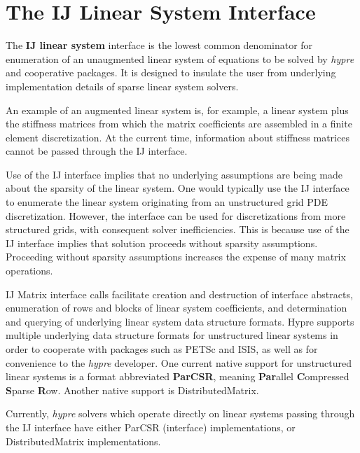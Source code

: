 \chapter{The IJ Linear System Interface}
\label{IJ}

The {\bf IJ linear system} interface is the lowest common denominator
for enumeration of an unaugmented linear system of equations to be
solved by {\slshape hypre} and cooperative packages.  It is designed
to insulate the user from underlying implementation details of sparse
linear system solvers.

An example of an augmented linear system is, for example, a linear
system plus the stiffness matrices from which the matrix coefficients
are assembled in a finite element discretization.  At the current time,
information about stiffness
matrices cannot be passed through the IJ interface. 

Use of the IJ interface implies that no underlying
assumptions are being made about the sparsity of the linear system. 
One would typically use the IJ interface to enumerate the linear
system originating from an unstructured grid PDE discretization.
However, the interface can be used for discretizations from more
structured grids, with consequent solver inefficiencies.  This
is because use of the IJ interface implies that solution
proceeds without sparsity assumptions.  Proceeding without sparsity
assumptions increases the expense of many matrix operations. 

IJ Matrix interface calls facilitate creation and destruction of 
interface abstracts, enumeration of rows and blocks of
linear system coefficients, and determination and querying of
underlying linear system data structure formats.  Hypre supports
multiple underlying data structure formats for unstructured linear
systems in order to cooperate with packages such as PETSc and ISIS, 
as well as for convenience to the {\slshape hypre} developer.
One current native support for unstructured linear systems is a
format abbreviated {\bf ParCSR}, meaning {\bf Par}allel
{\bf C}ompressed {\bf S}parse {\bf R}ow.  Another native support
is DistributedMatrix.

Currently, {\slshape hypre} solvers which operate directly on linear
systems passing through the IJ interface have either
ParCSR (interface) implementations, or DistributedMatrix
implementations.

